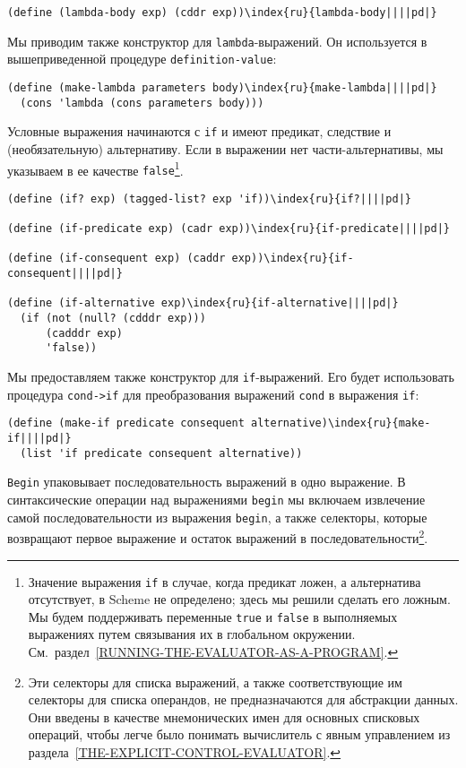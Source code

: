 \begin{plainlist}
\begin{Verbatim}[fontsize=\small]
(define (lambda-body exp) (cddr exp))\index{ru}{lambda-body||||pd|}
\end{Verbatim}
Мы приводим также конструктор для {\tt lambda}-выражений.  Он
используется в вышеприведенной процедуре
{\tt definition-value}:

\begin{Verbatim}[fontsize=\small]
(define (make-lambda parameters body)\index{ru}{make-lambda||||pd|}
  (cons 'lambda (cons parameters body)))
\end{Verbatim}

\item
Условные выражения начинаются с {\tt if} и
имеют предикат, следствие и (необязательную) альтернативу.  Если в
выражении нет части-альтер\-на\-ти\-вы, мы указываем в ее качестве
{\tt false}\footnote{Значение выражения {\tt if} в случае,
когда предикат ложен, а альтернатива отсутствует, в Scheme не
определено; здесь мы решили сделать его ложным.  Мы будем поддерживать
переменные {\tt true} и {\tt false} в выполняемых
выражениях путем связывания их в глобальном окружении.  
См.~раздел~\ref{RUNNING-THE-EVALUATOR-AS-A-PROGRAM}.}.

\begin{Verbatim}[fontsize=\small]
(define (if? exp) (tagged-list? exp 'if))\index{ru}{if?||||pd|}

(define (if-predicate exp) (cadr exp))\index{ru}{if-predicate||||pd|}

(define (if-consequent exp) (caddr exp))\index{ru}{if-consequent||||pd|}

(define (if-alternative exp)\index{ru}{if-alternative||||pd|}
  (if (not (null? (cdddr exp)))
      (cadddr exp)
      'false))
\end{Verbatim}
Мы предоставляем также конструктор для {\tt if}-выражений.  Его будет
использовать процедура {\tt cond->if} для преобразования
выражений {\tt cond} в выражения {\tt if}:

\begin{Verbatim}[fontsize=\small]
(define (make-if predicate consequent alternative)\index{ru}{make-if||||pd|}
  (list 'if predicate consequent alternative))
\end{Verbatim}

\item
{\tt Begin} упаковывает последовательность
выражений в одно выражение.  В синтаксические операции над
выражениями {\tt begin} мы включаем извлечение самой
последовательности из выражения {\tt begin}, а также селекторы,
которые возвращают первое выражение и остаток выражений в
последовательности\footnote{Эти селекторы для списка выражений, а также
соответствующие им селекторы для списка операндов, не предназначаются для
абстракции данных.  Они введены в качестве мнемонических имен для
основных списковых операций, чтобы легче было понимать вычислитель с
явным управлением из 
раздела~\ref{THE-EXPLICIT-CONTROL-EVALUATOR}.}.


\end{plainlist}
